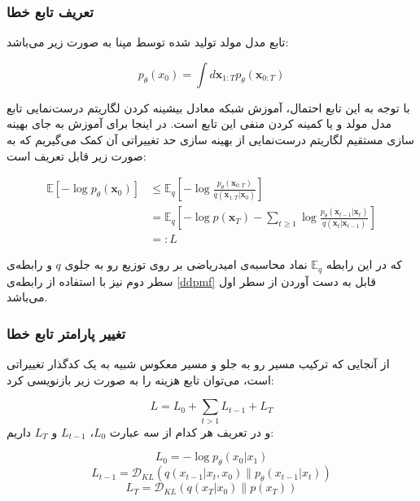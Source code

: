 \subsubsection{تعریف تابع خطا}

تابع مدل مولد تولید شده توسط مپنا به صورت زیر می‌باشد:

\begin{equation}
	p_{\theta}(x_0) = \int d\mathbf{x}_{1:T} p_{\theta}(\mathbf{x}_{0:T})
\end{equation}

با توجه به این تابع احتمال، آموزش شبکه معادل بیشینه کردن لگاریتم درست‌نمایی تابع مدل مولد و یا کمینه کردن منفی این تابع است.  در اینجا برای آموزش به جای بهینه سازی مستقیم لگاریتم درست‌نمایی از بهینه سازی حد تغییراتی آن کمک می‌گیریم که به صورت زیر قابل تعریف است:

\begin{equation}
\begin{align*}
	\mathbb{E}[- \log p_\theta(\mathbf{x}_0)] &\leq \mathbb{E}_q\left[-\log\frac{p_\theta(\mathbf{x}_{0:T})}{q(\mathbf{x}_{1:T}|\mathbf{x}_0)}\right] \\
	&= \mathbb{E}_q\left[-\log p(\mathbf{x}_T) - \sum_{t\geq 1}\log\frac{p_\theta(\mathbf{x}_{t-1}|\mathbf{x}_t)}{q(\mathbf{x}_t|\mathbf{x}_{t-1})}\right] \\
	&=: L
\end{align*}
\end{equation}

که در این رابطه $\mathbb{E}_q$  نماد محاسبه‌ی امیدریاضی بر روی توزیع رو به جلو‌ی $q$ و رابطه‌ی سطر دوم نیز با استفاده از رابطه‌ی  \ref{ddpmf} قابل به دست آوردن از سطر اول می‌باشد.

\subsubsection{تغییر پارامتر تابع خطا}
از آنجایی که ترکیب مسیر رو به جلو و مسیر معکوس شبیه به یک کدگذار تغییراتی است، می‌توان تابع هزینه را به صورت زیر بازنویسی کرد:



\begin{equation}
\label{total}
L = L_0 +\sum_{t>1} L_{t-1} + L_T
\end{equation}
 و در تعریف هر کدام از سه عبارت $L_0$، $L_{t-1}$ و $L_T$ داریم: 
 
\begin{equation}
L_0 = -\log p_\theta(x_0|x_1)
\end{equation}
\begin{equation}
\label{lt1}
L_{t-1} = \mathcal{D}_{KL}(q(x_{t-1}|x_t, x_0) \| p_\theta(x_{t-1}|x_t))
\end{equation}
\begin{equation}
L_T = \mathcal{D}_{KL}(q(x_T|x_0) \| p(x_T))
\end{equation}

